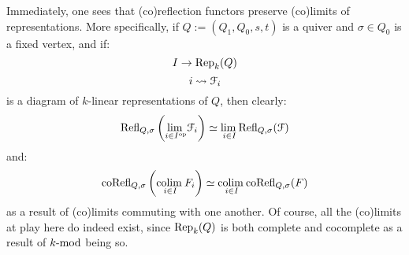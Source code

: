             \begin{remark} \label{remark: categorical_properties_of_(co)reflection_functors}
                Immediately, one sees that (co)reflection functors preserve (co)limits of representations. More specifically, if $Q := (Q_1, Q_0, s, t)$ is a quiver and $\sigma \in Q_0$ is a fixed vertex, and if:
                    $$I \to \Rep_k(Q)$$
                    $$i \mapsto \calF_i$$
                is a diagram of $k$-linear representations of $Q$, then clearly:
                    $$\Refl_{Q, \sigma}\left( \underset{i \in I^{\op}}{\lim} \calF_i \right) \cong \underset{i \in I}{\lim} \Refl_{Q, \sigma}(\calF)$$
                and:
                    $$\co\Refl_{Q, \sigma}\left( \underset{i \in I}{\colim} F_i \right) \cong \underset{i \in I}{\colim} \co\Refl_{Q, \sigma}(F)$$
                as a result of (co)limits commuting with one another. Of course, all the (co)limits at play here do indeed exist, since $\Rep_k(Q)$ is both complete and cocomplete as a result of $k\mod$ being so.
            \end{remark}
            
